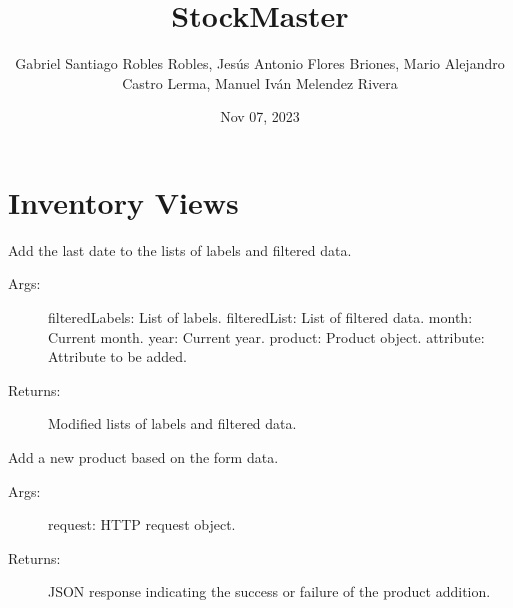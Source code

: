 \documentclass[letterpaper,10pt,english]{sphinxmanual}
\title{StockMaster}
\date{Nov 07, 2023}
\author{Gabriel Santiago Robles Robles, Jesús Antonio Flores Briones, Mario Alejandro Castro Lerma, Manuel Iván Melendez Rivera}
\begin{document}
\pagestyle{empty}
\sphinxmaketitle
\pagestyle{plain}
\sphinxtableofcontents
\pagestyle{normal}
\label{\detokenize{index::doc}}



\chapter{Inventory Views}
\label{\detokenize{modules/views:module-Inventory.views}}\label{\detokenize{modules/views:inventory-views}}\label{\detokenize{modules/views::doc}}

\begin{fulllineitems}
\label{\detokenize{modules/views:Inventory.views.AddLastDate}}
\sphinxAtStartPar
Add the last date to the lists of labels and filtered data.
\begin{description}
\item[{Args:}] \leavevmode
\sphinxAtStartPar
filteredLabels: List of labels.
filteredList: List of filtered data.
month: Current month.
year: Current year.
product: Product object.
attribute: Attribute to be added.

\item[{Returns:}] \leavevmode
\sphinxAtStartPar
Modified lists of labels and filtered data.

\end{description}

\end{fulllineitems}


\begin{fulllineitems}
\label{\detokenize{modules/views:Inventory.views.AddProduct}}
\sphinxAtStartPar
Add a new product based on the form data.
\begin{description}
\item[{Args:}] \leavevmode
\sphinxAtStartPar
request: HTTP request object.

\item[{Returns:}] \leavevmode
\sphinxAtStartPar
JSON response indicating the success or failure of the product addition.

\end{description}

\end{fulllineitems}
\end{document}

